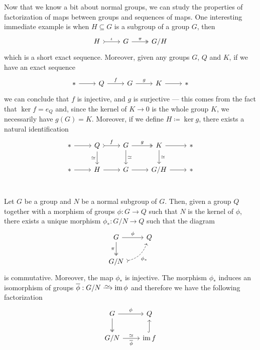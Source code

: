 Now that we know a bit about normal groups, we can study the properties of
factorization of maps between groups and sequences of maps. One interesting
immediate example is when \(H \subseteq G\) is a subgroup of a group \(G\), then
\[
  \begin{tikzcd}
    H \ar[r, tail, "\iota"] &G \ar[r, two heads, "\pi"] &G/H
  \end{tikzcd}
\]
which is a short exact sequence. Moreover, given any groups \(G\), \(Q\) and
\(K\), if we have an exact sequence
\[
  \begin{tikzcd}
    * \ar[r] &Q \ar[r, "f"] &G \ar[r, "g"] &K \ar[r] &*
  \end{tikzcd}
\]
we can conclude that \(f\) is injective, and \(g\) is surjective --- this comes
from the fact that \(\ker f = e_Q\) and, since the kernel of \(K \to 0\) is the
whole group \(K\), we necessarily have \(g(G) = K\). Moreover, if we define \(H
\coloneq \ker g\), there exists a natural identification
\[
  \begin{tikzcd}
    * \ar[r]
    &Q \ar[d, swap, "\iso"] \ar[r, tail, "f"]
    &G \ar[r, two heads, "g"] \ar[d, "\iso"]
    &K \ar[r] \ar[d, "\iso"]
    &* \\
    * \ar[r] &H \ar[r] &G \ar[r] &G/H \ar[r] &* \\
  \end{tikzcd}
\]

\begin{proposition}
\label{prop:universal-property-quotients-grp}
Let \(G\) be a group and \(N\) be a normal subgroup of \(G\). Then, given a
group \(Q\) together with a morphism of groups \(\phi: G \to Q\) such that
\(N\) is the kernel of \(\phi\), there exists a unique morphism
\(\phi_{*}: G/N \to Q\) such that the diagram
\[
  \begin{tikzcd}
    G \ar[d, two heads, swap, "\pi"] \ar[r, "\phi"] &Q \\
    G/N \ar[ur, dashed, swap, bend right, tail, "\phi_{*}"] &
  \end{tikzcd}
\]
is commutative. Moreover, the map \(\phi_*\) is injective. The morphism
\(\phi_{*}\) induces an isomorphism of groups
\(\overline{\phi}: G/N \isoto \im \phi\) and therefore we have the following
factorization
\[
  \begin{tikzcd}
  G \ar[d, two heads] \ar[r, "\phi"] &Q \\
  G/N \ar[r, "\overline{\phi}"', "\dis"]
  &\im f \ar[u, hook]
  \end{tikzcd}
\]
\end{proposition}

